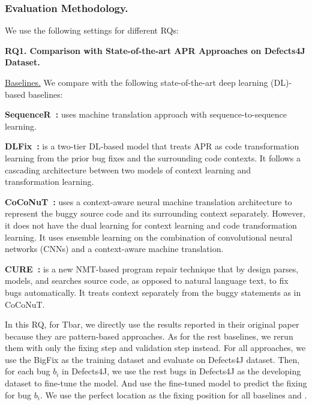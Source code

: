 \subsubsection{Evaluation Methodology.} 
We use the following settings for different RQs:

{\bf RQ1. Comparison with State-of-the-art APR Approaches on Defects4J Dataset.}

\underline{Baselines.} We compare {\tool} with the following
state-of-the-art deep learning (DL)-based baselines:



{\bf SequenceR~\cite{chen2018sequencer}: } uses machine translation
approach with sequence-to-sequence learning.

{\bf DLFix~\cite{li2020dlfix}: } is a two-tier DL-based model that
treats APR as code transformation learning from the prior bug fixes
and the surrounding code contexts. It follows a cascading architecture
between two models of context learning and transformation learning.

{\bf CoCoNuT~\cite{lutellier2020coconut}:} uses a context-aware neural
machine translation architecture to represent the buggy source code
and its surrounding context separately. However, it does not have the
dual learning for context learning and code transformation learning.
It uses ensemble learning on the combination of convolutional neural
networks (CNNs) and a context-aware machine translation.

{\bf CURE~\cite{cure-icse21}: } is a new NMT-based program repair
technique that by design parses, models, and searches source code, as
opposed to natural language text, to fix bugs automatically. It treats
context separately from the buggy statements as in CoCoNuT.

In this RQ, for %
Tbar, we directly use the results reported in their original paper because they are pattern-based approaches. As for the rest baselines, we rerun them with only the fixing step and validation step instead. For all approaches, we use the BigFix as the training dataset and evaluate on Defects4J dataset. Then, for each bug $b_i$ in Defects4J, we use the rest bugs in Defects4J as the developing dataset to fine-tune the model. And use the fine-tuned model to predict the fixing for bug $b_i$. We use the perfect location as the fixing position for all baselines and \tool. 

